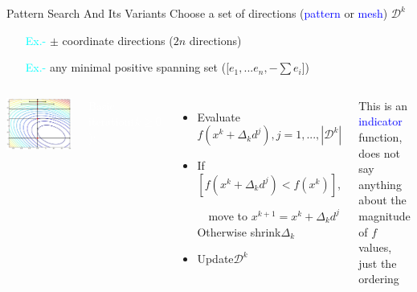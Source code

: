 \documentclass[handout,aspectratio=54]{beamer}
\numberwithin{theorem}{section}
\begin{document}
\begin{frame}{Pattern Search And Its Variants}\footnotesize
Choose a set of directions (\textcolor{blue}{pattern} or \textcolor{blue}{mesh}) $\mathcal{D}^k$

\begin{itemize}
\item[\textcolor{cyan}{Ex.-}] $\pm$ coordinate directions ($2n$ directions)
\item[\textcolor{cyan}{Ex.-}] any minimal positive spanning set ([$e_1,...e_n,-\sum e_i$])
\end{itemize}

\begin{columns}
\includegraphics[width=\textwidth]{fig/17-5.jpg}

\colorbox[rgb]{0.5,0.6,0.7}{\textcolor{white}{Basic iteration($k\ge0$):}}
\begin{itemize}\scriptsize
\item Evaluate $f(x^k+\Delta_kd^j),j=1,...,|\mathcal{D}^k|$
\item If $[f(x^k+\Delta_kd^j)<f(x^k)]$, 

$\quad$move to $x^{k+1}=x^k+\Delta_kd^j$\\

Otherwise shrink$\Delta_k$
\item Update$\mathcal{D}^k$
\end{itemize}
This is an \textcolor{blue}{indicator} function, does not say anything about the magnitude of $f$ values, just the ordering
\end{columns}

\vspace{1.2cm}

\tiny
{}

\end{frame}
\end{document}
